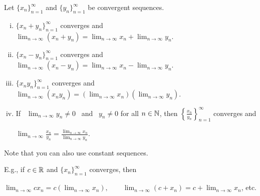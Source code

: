 \documentclass[10pt,aspectratio=149]{beamer}
\begin{document}
\begin{frame}
\begin{proposition}
Let $\{ x_n \}_{n=1}^\infty$ and $\{ y_n \}_{n=1}^\infty$ be convergent sequences.
\pause
\begin{enumerate}[(i)]
\item \label{prop:contalg:i}
$\{ x_n + y_n \}_{n=1}^\infty$ converges and
$\displaystyle
\lim_{n \to \infty} (x_n + y_n) = 
\lim_{n \to \infty} x_n + 
\lim_{n \to \infty} y_n$.
\item \label{prop:contalg:ii}
\pause
$\{ x_n - y_n \}_{n=1}^\infty$ converges and
$\displaystyle
\lim_{n \to \infty} (x_n - y_n) = 
\lim_{n \to \infty} x_n - 
\lim_{n \to \infty} y_n$.
\item \label{prop:contalg:iii}
\pause
$\{ x_n y_n \}_{n=1}^\infty$ converges and
$\displaystyle
\lim_{n \to \infty} (x_n y_n) = 
\left( \lim_{n \to \infty} x_n \right)
\left( \lim_{n \to \infty} y_n \right)$.
\item \label{prop:contalg:iv}
\pause
If ~$\displaystyle \lim_{n\to\infty} y_n \not= 0$~ and ~$y_n \not= 0$ for all $n \in {\mathbb{N}}$, then
$\left\{ \frac{x_n}{y_n} \right\}_{n=1}^\infty$ converges and

$\displaystyle
\lim_{n \to \infty} \frac{x_n}{y_n} = 
\frac{\lim_{n\to\infty} x_n}{\lim_{n\to\infty} y_n}$.
\end{enumerate}
\end{proposition}

\pause

Note that you can also use constant sequences.

\pause

E.g., if $c \in {\mathbb{R}}$ and $\{ x_n \}_{n=1}^\infty$ converges, then

$\displaystyle
\lim_{n \to \infty} c x_n = 
c \left( \lim_{n \to \infty} x_n \right), \qquad
\lim_{n \to \infty} (c + x_n) = 
c + \lim_{n \to \infty} x_n$, \qquad etc.

\end{frame}
\end{document}
